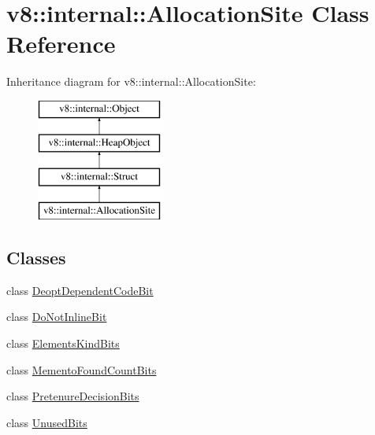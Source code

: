 \hypertarget{classv8_1_1internal_1_1_allocation_site}{}\section{v8\+:\+:internal\+:\+:Allocation\+Site Class Reference}
\label{classv8_1_1internal_1_1_allocation_site}
Inheritance diagram for v8\+:\+:internal\+:\+:Allocation\+Site\+:\begin{figure}[H]
\begin{center}
\leavevmode
\includegraphics[height=4.000000cm]{classv8_1_1internal_1_1_allocation_site}
\end{center}
\end{figure}
\subsection*{Classes}
\begin{DoxyCompactItemize}
\item 
class \hyperlink{classv8_1_1internal_1_1_allocation_site_1_1_deopt_dependent_code_bit}{Deopt\+Dependent\+Code\+Bit}
\item 
class \hyperlink{classv8_1_1internal_1_1_allocation_site_1_1_do_not_inline_bit}{Do\+Not\+Inline\+Bit}
\item 
class \hyperlink{classv8_1_1internal_1_1_allocation_site_1_1_elements_kind_bits}{Elements\+Kind\+Bits}
\item 
class \hyperlink{classv8_1_1internal_1_1_allocation_site_1_1_memento_found_count_bits}{Memento\+Found\+Count\+Bits}
\item 
class \hyperlink{classv8_1_1internal_1_1_allocation_site_1_1_pretenure_decision_bits}{Pretenure\+Decision\+Bits}
\item 
class \hyperlink{classv8_1_1internal_1_1_allocation_site_1_1_unused_bits}{Unused\+Bits}
\end{DoxyCompactItemize}
